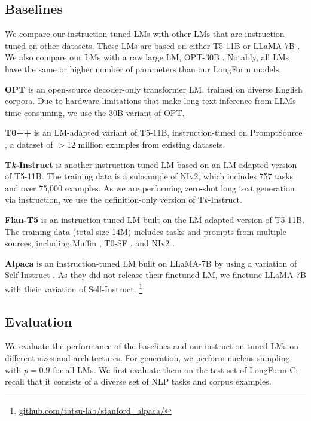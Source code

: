 	\subsection{Baselines}
	We compare our instruction-tuned LMs with other LMs that are instruction-tuned on other datasets. These LMs are based on either T5-11B \cite{JMLR:v21:20-074_raffel_t5,
	lester-etal-2021-power} or LLaMA-7B \cite{touvron2023llama}. We also compare our LMs with a raw large LM, OPT-30B \cite{zhang2022opt}. Notably, all LMs have the same or higher number of parameters than our LongForm models.

	\textbf{OPT} \cite{zhang2022opt} is an open-source decoder-only transformer LM, trained on diverse English corpora. Due to hardware limitations that make long text inference from LLMs time-consuming, we use the 30B variant of OPT.

	\textbf{T0++} \cite{sanh2022multitask} is an LM-adapted variant of T5-11B, instruction-tuned on PromptSource \cite{bach-etal-2022-promptsource}, a dataset of $>$12 million examples from existing datasets.

	\textbf{T\textit{k}-Instruct} \cite{wang-etal-2022-super} is another instruction-tuned LM based on an LM-adapted version of T5-11B. The training data is a subsample of NIv2, which includes 757 tasks and over 75,000 examples. As we are performing zero-shot long text generation via instruction, we use the definition-only version of T\textit{k}-Instruct.

	\textbf{Flan-T5} \cite{chung2022scaling} is an instruction-tuned LM built on the LM-adapted version of T5-11B. The training data (total size 14M) includes tasks and prompts from multiple sources, including Muffin \cite{wei2022finetuned}, T0-SF \cite{sanh2022multitask}, and NIv2 \cite{wang-etal-2022-super}.

	\textbf{Alpaca} is an instruction-tuned LM  built on LLaMA-7B \cite{touvron2023llama} by using a variation of Self-Instruct \cite{wang2022selfinstruct}. As they did not release their finetuned LM, we finetune LLaMA-7B with their variation of Self-Instruct.
                                \footnote{\url{github.com/tatsu-lab/stanford_alpaca/}}

	\subsection{Evaluation}
	We evaluate the performance of the baselines and our instruction-tuned LMs on different sizes and architectures. For generation, we perform nucleus sampling \cite{Holtzman2020The} with $p=0.9$ for all LMs. We first evaluate them on the test set of LongForm-C; recall that it consists of a diverse set of NLP tasks and corpus examples.

